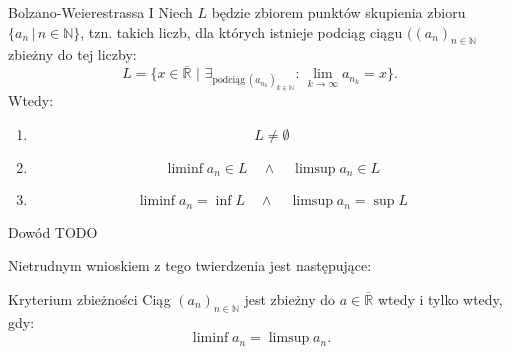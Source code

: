 \documentclass{article}
\numberwithin{defi}{section}
\numberwithin{defi}{section}
\newcommand{\R}{\mathbb{R}}
\newcommand{\Rbar}{\overline{\mathbb{R}}}
\newcommand{\N}{\mathbb{N}}
\newcommand{\ciag}[1]{(#1_{n})_{n \in \N}}
\begin{document}
\begin{twier}{Bolzano-Weierestrassa I} \label{twier:BL I}
    Niech $L$ będzie zbiorem punktów skupienia zbioru $\{a_n \, | \, n \in \N\}$, tzn. takich liczb, dla których istnieje podciąg ciągu $(\ciag{a}$ zbieżny do tej liczby: \begin{equation}
        L = \{ x \in \overline{\R} \,\, | \,\, \exists_{\text{podciąg} \, (a_{n_k})_{k \in \N}} : \, \lim_{k \to \infty} a_{n_k} = x \}.
    \end{equation}
    Wtedy:
    \begin{enumerate}
        \item \begin{equation}
                  L \neq \emptyset
              \end{equation}
        \item \begin{equation}
                  \liminf{a_n} \in L  \quad \land \quad \limsup{a_n} \in L
              \end{equation}
        \item \begin{equation}
                  \liminf{a_n} = \inf{L} \quad \land \quad \limsup{a_n} = \sup{L}
              \end{equation}
    \end{enumerate}
\end{twier}

\begin{dow}{Dowód}
    TODO
\end{dow}

Nietrudnym wnioskiem z tego twierdzenia jest następujące:
\begin{twier}{Kryterium zbieżności}
    Ciąg $\ciag{a}$ jest zbieżny do $a \in \Rbar$ wtedy i tylko wtedy, gdy: \begin{equation}
        \liminf a_n = \limsup a_n.
    \end{equation}
\end{twier}
\end{document}
